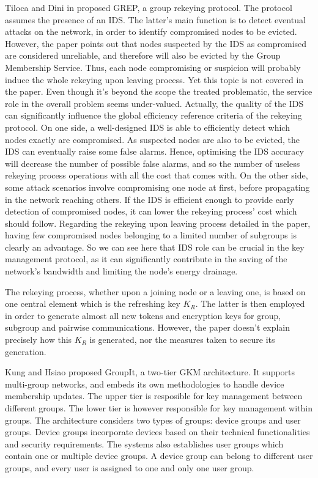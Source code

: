 Tiloca and Dini in \cite{tiloca_grep_2016} proposed GREP, a group rekeying protocol. The protocol assumes the presence of an IDS. The latter’s main function is to detect eventual attacks on the network, in order to identify compromised nodes to be evicted. However, the paper points out that nodes suspected by the IDS as compromised are considered unreliable, and therefore will also be evicted by the Group Membership Service. Thus, each node compromising or suspicion will probably induce the whole rekeying upon leaving process.
Yet this topic is not covered in the paper. Even though it’s beyond the scope the treated problematic, the service role in the overall problem seems under-valued. Actually, the quality of the IDS can significantly influence the global efficiency reference criteria of the rekeying protocol. On one side, a well-designed IDS is able to efficiently detect which nodes exactly are compromised. As suspected nodes are also to be evicted, the IDS can eventually raise some false alarms. Hence, optimising the IDS accuracy will decrease the number of possible false alarms, and so the number of useless rekeying process operations with all the cost that comes with. On the other side, some attack scenarios involve compromising one node at first, before propagating in the network reaching others. If the IDS is efficient enough to provide early detection of compromised nodes, it can lower the rekeying process’ cost which should follow. Regarding the rekeying upon leaving process detailed in the paper, having few compromised nodes belonging to a limited number of subgroups is clearly an advantage.
So we can see here that IDS role can be crucial in the key management protocol, as it can significantly contribute in the saving of the network’s bandwidth and limiting the node’s energy drainage.

The rekeying process, whether upon a joining node or a leaving one, is based on one central element which is the refreshing key $K_R$. The latter is then employed in order to generate almost all new tokens and encryption keys for group, subgroup and pairwise communications. However, the paper doesn’t explain precisely how this $K_R$ is generated, nor the measures taken to secure its generation.

Kung and Hsiao \cite{kung_groupit_2018} proposed GroupIt, a two-tier GKM architecture. It supports multi-group networks, and embeds its own methodologies to handle device membership updates. The upper tier is resposible for key management between different groups. The lower tier is however responsible for key management within groups. The architecture considers two types of groups: device groups and user groups. Device groups incorporate devices based on their technical functionalities and security requirements. The systems also establishes user groups which contain one or multiple device groups. A device group can belong to different user groups, and every user is assigned to one and only one user group.

